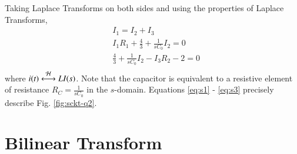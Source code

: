 \documentclass[journal,12pt,twocolumn]{IEEEtran}
\renewcommand\thesection{\arabic{section}}
\begin{document}
\begin{enumerate}[label=\arabic*.,ref=\thesection.\theenumi]
Taking Laplace Transforms on both sides and using the properties of Laplace Transforms,
\begin{align}
&I_1 = I_2 +I_3 \label{eq:s1}\\
&I_1R_1 + \frac{4}{3} + \frac{1}{sC_0}I_2 = 0 \\
&\frac{4}{3} + \frac{1}{sC_0}I_2 - I_3R_2 - 2 = 0 \label{eq:s3} \\
\end{align}
where $i(t) \overset{\mathcal{H}}{ \longleftrightarrow}{L} I(s)$. Note that the capacitor is equivalent to a resistive element of resistance $R_C = \frac{1}{sC_0}$ in the $s$-domain. Equations \eqref{eq:s1} - \eqref{eq:s3} precisely describe Fig. \ref{fig:sckt-q2}.
\end{enumerate}

\section{Bilinear Transform}
\end{document}
